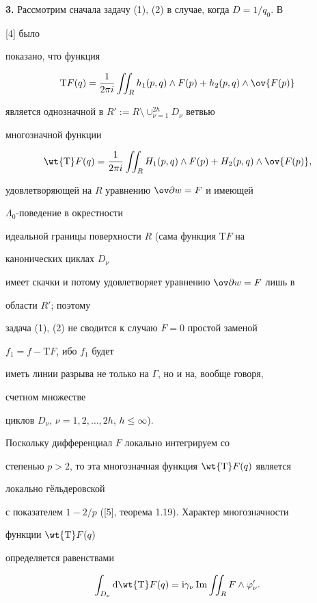\medskip 


 


{\bf 3.} Рассмотрим сначала задачу (1), (2) в случае, когда $D=1/q_0$. В 


[4] было 


показано, что функция 


$$ 


{\mathrm T}F(q)=\frac{1}{2\pi i}\iint_R h_1(p,q)\wedge F(p) 


+h_2(p,q)\wedge\ov{F(p)} 


$$ 


является однозначной в $R':=R\setminus\cup^{2h}_{\nu=1}D_\nu$ ветвью 


многозначной функции 


$$ 


\wt{\mathrm T}F(q)=\frac{1}{2\pi i}\iint_R 


H_1(p,q)\wedge F(p)+H_2(p,q)\wedge\ov{F(p)}, 


$$ 


удовлетворяющей на $R$ уравнению $\ov\partial w=F$ и имеющей 


$\Lambda_0$-поведение в окрестности 


идеальной границы поверхности $R$ (сама функция ${\mathrm T}F$ на 


канонических циклах $D_\nu$ 


имеет скачки и потому удовлетворяет уравнению $\ov\partial w=F$ лишь в 


области $R'$; поэтому 


задача (1), (2) не сводится к случаю $F=0$ простой заменой 


$f_1=f-{\mathrm T}F$, ибо $f_1$ будет 


иметь линии разрыва не только на $\Gamma$, но и на, вообще говоря, 


счетном множестве 


циклов $D_\nu$, $\nu=1,2,\dotsc,2h$, $h\le\infty$). 


Поскольку дифференциал $F$ локально интегрируем со 


степенью $p>2$, то эта многозначная функция $\wt{\mathrm T}F(q)$ является 


локально г\"ельдеровской 


с показателем $1-2/p$ ([5], теорема 1.19). Характер многозначности 


функции $\wt{\mathrm T}F(q)$ 


определяется равенствами 


\begin{equation} 


\int_{D_\nu}{\mathrm d}\wt{\mathrm T}F(q)={\mathrm i} 


\gamma_\nu\im\iint_R F\wedge\varphi'_\nu. 


\end{equation} 


